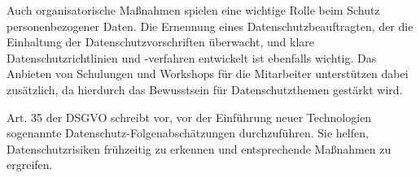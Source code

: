 Auch organisatorische Maßnahmen spielen eine wichtige Rolle beim Schutz
personenbezogener Daten. Die Ernennung eines Datenschutzbeauftragten, der die
Einhaltung der Datenschutzvorschriften überwacht, und klare
Datenschutzrichtlinien und -verfahren entwickelt ist ebenfalls wichtig. Das
Anbieten von Schulungen und Workshops für die Mitarbeiter unterstützen dabei
zusätzlich, da hierdurch das Bewusstsein für Datenschutzthemen gestärkt wird.

Art. 35 der DSGVO schreibt vor, vor der Einführung neuer Technologien sogenannte
Datenschutz-Folgenabschätzungen durchzuführen. Sie helfen, Datenschutzrisiken
frühzeitig zu erkennen und entsprechende Maßnahmen zu ergreifen.

\cite{conrad_2017}
